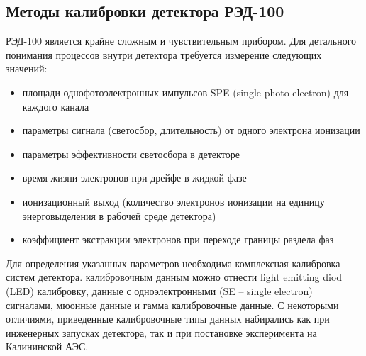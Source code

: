 \subsection{Методы калибровки детектора РЭД-100}
\label{subsect2_1_4}
РЭД-100 является крайне сложным и чувствительным прибором. Для детального понимания процессов внутри детектора требуется измерение следующих значений:
\begin{itemize}
    \item площади однофотоэлектронных импульсов SPE (single photo electron) для каждого канала
    \item параметры сигнала (светосбор, длительность) от одного электрона ионизации
    \item параметры эффективности светосбора в детекторе
    \item время жизни электронов при дрейфе в жидкой фазе
    \item ионизационный выход (количество электронов ионизации на единицу энерговыделения в рабочей среде детектора)
    \item коэффициент экстракции электронов при переходе границы раздела фаз
\end{itemize}
\par Для определения указанных параметров необходима комплексная калибровка систем детектора. 
	 калибровочным данным можно отнести light emitting diod (LED) калибровку, данные с одноэлектронными (SE -- single electron) сигналами, мюонные данные и гамма калибровочные данные. С некоторыми отличиями, приведенные калибровочные типы данных набирались как при инженерных запусках детектора, так и при постановке эксперимента на Калининской АЭС.
